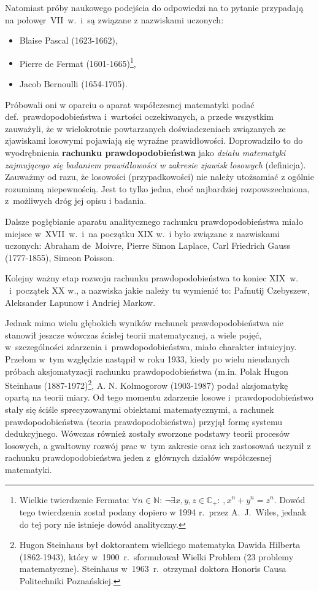 \documentclass[10pt,a4paper]{article}
\numberwithin{equation}{subsection}
\begin{document}
Natomiast próby naukowego podejścia do odpowiedzi na to pytanie przypadają
na połowęr~VII~w.\ i~są związane z nazwiskami uczonych:
\begin{itemize}
  \item Blaise Pascal (1623-1662),
  \item Pierre de Fermat (1601-1665)\footnote{Wielkie twierdzenie Fermata:
      $\forall n\in\mathbb{N}:\,\neg\exists x,y,z\in\mathbb{C}_+:\,,x^n+y^n=z^n$.
      Dowód tego twierdzenia został podany dopiero w 1994 r.\ przez A.~J.~Wiles,
      jednak do tej pory nie istnieje dowód analityczny.},
  \item Jacob Bernoulli (1654-1705).
\end{itemize}


Próbowali oni w oparciu o aparat współczesnej matematyki podać
def.~prawdopodobieństwa i~wartości oczekiwanych, a przede wszystkim zauważyli,
że w wielokrotnie powtarzanych doświadczeniach związanych ze zjawiskami losowymi
pojawiają się wyraźne prawidłowości. Doprowadziło to do wyodrębnienia
\textbf{rachunku prawdopodobieństwa} jako \textit{działu matematyki zajmującego
  się badaniem prawidłowości w zakresie zjawisk losowych} (definicja). Zauważmy
od razu, że losowości (przypadkowości) nie należy utożsamiać z ogólnie rozumianą
niepewnością. Jest to tylko jedna, choć najbardziej rozpowszechniona,
z~możliwych dróg jej opisu i badania.

Dalsze pogłębianie aparatu analitycznego rachunku prawdopodobieństwa miało
miejsce w~XVII~w.\ i~na początku XIX w.\ i było związane z nazwiskami uczonych:
Abraham de~Moivre, Pierre Simon Laplace, Carl Friedrich Gauss (1777-1855),
Simeon Poisson.

Kolejny ważny etap rozwoju rachunku prawdopodobieństwa to koniec XIX~w.
\ i~początek XX w., a nazwiska jakie należy tu wymienić to:
Pafnutij Czebyszew, Aleksander Lapunow i Andriej Markow.

Jednak mimo wielu głębokich wyników rachunek prawdopodobieństwa nie stanowił
jeszcze wówczas ścisłej teorii matematycznej, a wiele pojęć, w~szczególności
zdarzenia i~prawdopodobieństwa, miało charakter intuicyjny. Przełom w~tym
względzie nastąpił w roku 1933, kiedy po wielu nieudanych próbach aksjomatyzacji
rachunku prawdopodobieństwa (m.in. Polak Hugon Steinhaus (1887-1972)\footnote{Hugon
Steinhaus był doktorantem wielkiego matematyka Dawida Hilberta (1862-1943),
który w~1900~r.\ sformułował Wielki Problem (23 problemy matematyczne). Steinhaus
w~1963~r.\ otrzymał doktora Honoris Causa Politechniki Poznańskiej.},
A. N. Kołmogorow (1903-1987) podał aksjomatykę opartą na teorii
miary.  Od tego momentu zdarzenie losowe i~prawdopodobieństwo stały się ściśle
sprecyzowanymi obiektami matematycznymi, a rachunek prawdopodobieństwa (teoria
prawdopodobieństwa) przyjął formę systemu dedukcyjnego. Wówczas również zostały
sworzone podstawy teorii procesów losowych, a gwałtowny rozwój prac
w~tym zakresie oraz ich zastosowań uczynił z rachunku prawdopodobieństwa jeden
z~głównych działów współczesnej matematyki.
\end{document}
